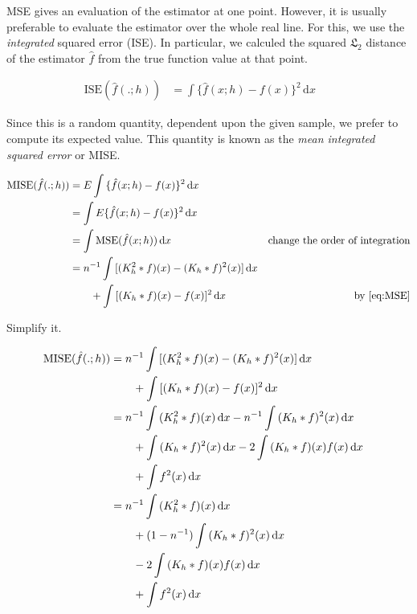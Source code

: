 MSE gives an evaluation of the estimator at one point.
However, it is usually preferable to evaluate the estimator over the whole real line.
For this, we use the \textit{integrated} squared error (ISE).
In particular, we calculed the squared $\mathfrak{L}_2$ distance of the estimator $\hat{f}$ from the true function value at that point.

\begin{align}
\mbox{ISE}(\hat{f}(.;h)) & = \int{\{ \hat{f}(x;h) - f(x) \} ^2 }\,\mathrm{d}x && \nonumber
\end{align}

Since this is a random quantity, dependent upon the given sample, we prefer to compute its expected value.
This quantity is known as the \textit{mean integrated squared error} or MISE.

\begin{align}
\mbox{MISE}(\hat{f}(.;h)) & = E \int{\{ \hat{f}(x;h) - f(x) \} ^2 }\,\mathrm{d}x && \nonumber \\
    & = \int{ E \{ \hat{f}(x;h) - f(x) \} ^2 }\,\mathrm{d}x && \nonumber \\
    & = \int{ \mbox{MSE}(\hat{f}(x;h))\, \mathrm{d}x} & \text{change the order of integration} & \nonumber \\
    & = n^{-1} \int{ [ \conv{K_h^2}{f}(x) - \conv{K_h}{f}^2(x) ]\,\mathrm{d}x } \nonumber \\
    & \qquad + \int{ [ \conv{K_h}{f}(x) - f(x) ]^2\,\mathrm{d}x} & \text{by \autoref{eq:MSE}} \nonumber
\end{align}

Simplify it.

\begin{align}
\mbox{MISE}(\hat{f}(.;h)) & = n^{-1} \int{ [ (\ensuremath{K_h^2 \ast f})(x) - (\ensuremath{K_h \ast f})^2(x) ]\,\mathrm{d}x } && \nonumber \\
    & \qquad + \int{ [ (\ensuremath{K_h \ast f})(x) - f(x) ]^2\,\mathrm{d}x} && \nonumber \\
    & = n^{-1} \int{ (\ensuremath{K_h^2 \ast f})(x)\,\mathrm{d}x } - n^{-1} \int{(\ensuremath{K_h \ast f})^2(x)\,\mathrm{d}x } && \nonumber \\
    & \qquad + \int{ (\ensuremath{K_h \ast f})^2(x)\,\mathrm{d}x} - 2\int{(\ensuremath{K_h \ast f})(x) f(x)\,\mathrm{d}x } && \nonumber \\
    & \qquad + \int{ f^2(x)\,\mathrm{d}x} && \nonumber \\
    & = n^{-1} \int{ (\ensuremath{K_h^2 \ast f})(x)\,\mathrm{d}x } && \nonumber \\
    & \qquad + (1 - n^{-1}) \int{(\ensuremath{K_h \ast f})^2(x)\,\mathrm{d}x } && \nonumber \\
    & \qquad - 2\int{(\ensuremath{K_h \ast f})(x) f(x)\,\mathrm{d}x } && \nonumber \\
    & \qquad + \int{ f^2(x)\,\mathrm{d}x} \label{eq:MISE-1} &&
\end{align}

